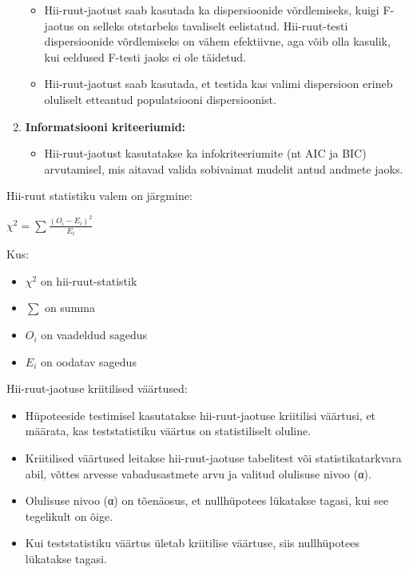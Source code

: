 \documentclass[
]{book}
\providecommand{\tightlist}{%
  \setlength{\itemsep}{0pt}\setlength{\parskip}{0pt}}
\begin{document}
\begin{enumerate}
  \begin{itemize}
  \tightlist
  \item
    Hii-ruut-jaotust saab kasutada ka dispersioonide võrdlemiseks, kuigi F-jaotus on selleks otstarbeks tavaliselt eelistatud. Hii-ruut-testi dispersioonide võrdlemiseks on vähem efektiivne, aga võib olla kasulik, kui eeldused F-testi jaoks ei ole täidetud.
  \item
    Hii-ruut-jaotust saab kasutada, et testida kas valimi dispersioon erineb oluliselt etteantud populatsiooni dispersioonist.
  \end{itemize}
\item
  \textbf{Informatsiooni kriteeriumid:}

  \begin{itemize}
  \tightlist
  \item
    Hii-ruut-jaotust kasutatakse ka infokriteeriumite (nt AIC ja BIC) arvutamisel, mis aitavad valida sobivaimat mudelit antud andmete jaoks.
  \end{itemize}
\end{enumerate}

Hii-ruut statistiku valem on järgmine:

\(\chi^2 = \sum \frac{(O_i - E_i)^2}{E_i}\)

Kus:

\begin{itemize}
\tightlist
\item
  \(\chi^2\) on hii-ruut-statistik
\item
  \(\sum\) on summa
\item
  \(O_i\) on vaadeldud sagedus
\item
  \(E_i\) on oodatav sagedus
\end{itemize}

Hii-ruut-jaotuse kriitilised väärtused:

\begin{itemize}
\tightlist
\item
  Hüpoteeside testimisel kasutatakse hii-ruut-jaotuse kriitilisi väärtusi, et määrata, kas teststatistiku väärtus on statistiliselt oluline.
\item
  Kriitilised väärtused leitakse hii-ruut-jaotuse tabelitest või statistikatarkvara abil, võttes arvesse vabadusastmete arvu ja valitud olulisuse nivoo (α).
\item
  Olulisuse nivoo (α) on tõenäosus, et nullhüpotees lükatakse tagasi, kui see tegelikult on õige.
\item
  Kui teststatistiku väärtus ületab kriitilise väärtuse, siis nullhüpotees lükatakse tagasi.
\end{itemize}
\end{document}
